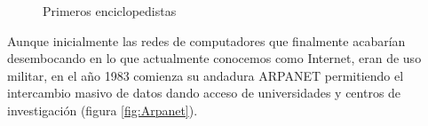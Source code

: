 
\begin{figure}[hbtp]
	\begin{adjustbox}{minipage=\linewidth, fbox}
		\centering
		\hspace{20mm}
		\label{fig:Introduccion_enciclopedistas}
	\end{adjustbox}
\caption{Primeros enciclopedistas}
\end{figure}

Aunque inicialmente las redes de computadores que finalmente acabarían desembocando en lo que actualmente conocemos como Internet, eran de uso militar, en el año 1983  comienza su andadura \acs{ARPANET} permitiendo el intercambio masivo de datos dando acceso de universidades y centros de investigación (figura \ref{fig:Arpanet}).%

